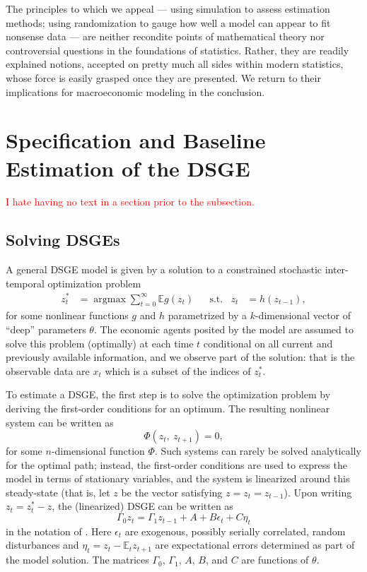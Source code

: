\documentclass[11pt]{article}
\newcommand{\E}{\mathbb{E}}
\DeclareMathOperator*{\argmax}{argmax}
\newcommand{\attn}[1]{\textcolor{red}{#1}}
\begin{document}
The principles to which we appeal --- using simulation to assess
estimation methods; using randomization to gauge how well a model can
appear to fit nonsense data --- are neither recondite points of
mathematical theory nor controversial questions in the foundations of
statistics. Rather, they are readily explained notions, accepted on
pretty much all sides within modern statistics, whose force is easily
grasped once they are presented. We return to their implications for
macroeconomic modeling in the conclusion.

\hypertarget{specification-and-baseline-estimation-of-the-dsge}{%
\section{Specification and Baseline Estimation of the
DSGE}\label{specification-and-baseline-estimation-of-the-dsge}}

\attn{I hate having no text in a section prior to the subsection.}

\hypertarget{sec:solveDSGEs}{%
\subsection{Solving DSGEs}\label{sec:solveDSGEs}}

A general DSGE model is given by a solution to a constrained stochastic
inter-temporal optimization problem \begin{align}
  z_t^* &=\argmax \sum_{t=0}^\infty \E g(z_t) &&\mbox{s.t.}&z_t&=h(z_{t-1}),
\end{align} for some nonlinear functions \(g\) and \(h\) parametrized by
a \(k\)-dimensional vector of ``deep'' parameters \(\theta\). The
economic agents posited by the model are assumed to solve this problem
(optimally) at each time \(t\) conditional on all current and previously
available information, and we observe part of the solution: that is the
observable data are \(x_t\) which is a subset of the indices of
\(z_t^*\).

To estimate a DSGE, the first step is to solve the optimization problem
by deriving the first-order conditions for an optimum. The resulting
nonlinear system can be written as \begin{equation}
  \Phi(z_t,\ z_{t+1})=0,
\end{equation} for some \(n\)-dimensional function \(\Phi\). Such
systems can rarely be solved analytically for the optimal path; instead,
the first-order conditions are used to express the model in terms of
stationary variables, and the system is linearized around this
steady-state (that is, let \(z\) be the vector satisfying
\(z=z_t=z_{t-1}\)). Upon writing \(z_t = z^*_t - z\), the (linearized)
DSGE can be written as \begin{equation}
  \Gamma_0 z_t = \Gamma_1 z_{t-1} + A + B \epsilon_t + C \eta_t
  \label{eq:lin-dsge}
\end{equation} in the notation of \citep{Sims2002}. Here \(\epsilon_t\)
are exogenous, possibly serially correlated, random disturbances and
\(\eta_t=z_t - \E_t z_{t+1}\) are expectational errors determined as
part of the model solution. The matrices \(\Gamma_0\), \(\Gamma_1\),
\(A\), \(B\), and \(C\) are functions of \(\theta\).
\end{document}
